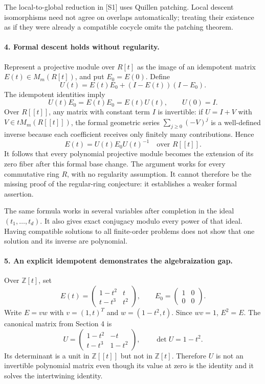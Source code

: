 \documentclass[11pt]{article}
\begin{document}
The local-to-global reduction in [S1] uses Quillen patching. Local descent isomorphisms need not agree on overlaps automatically; treating their existence as if they were already a compatible cocycle omits the patching theorem.

\paragraph{4. Formal descent holds without regularity.}
Represent a projective module over $R[t]$ as the image of an idempotent matrix $E(t)\in M_m(R[t])$, and put $E_0=E(0)$. Define
\[
 U(t)=E(t)E_0+(I-E(t))(I-E_0).
\]
The idempotent identities imply
\[
 U(t)E_0=E(t)E_0=E(t)U(t),\qquad U(0)=I.
\]
Over $R[[t]]$, any matrix with constant term $I$ is invertible: if $U=I+V$ with $V\in tM_m(R[[t]])$, the formal geometric series $\sum_{j\geq0}(-V)^j$ is a well-defined inverse because each coefficient receives only finitely many contributions. Hence
\[
 E(t)=U(t)E_0U(t)^{-1}\quad\text{over }R[[t]].
\]
It follows that every polynomial projective module becomes the extension of its zero fiber after this formal base change. The argument works for every commutative ring $R$, with no regularity assumption. It cannot therefore be the missing proof of the regular-ring conjecture: it establishes a weaker formal assertion.

The same formula works in several variables after completion in the ideal $(t_1,\ldots,t_d)$. It also gives exact conjugacy modulo every power of that ideal. Having compatible solutions to all finite-order problems does not show that one solution and its inverse are polynomial.

\paragraph{5. An explicit idempotent demonstrates the algebraization gap.}
Over $\mathbb Z[t]$, set
\[
 E(t)=\begin{pmatrix}1-t^2&t\\t-t^3&t^2\end{pmatrix},
 \qquad E_0=\begin{pmatrix}1&0\\0&0\end{pmatrix}.
\]
Write $E=vw$ with $v=(1,t)^T$ and $w=(1-t^2,t)$. Since $wv=1$, $E^2=E$. The canonical matrix from Section 4 is
\[
 U=\begin{pmatrix}1-t^2&-t\\t-t^3&1-t^2\end{pmatrix},
 \qquad\det U=1-t^2.
\]
Its determinant is a unit in $\mathbb Z[[t]]$ but not in $\mathbb Z[t]$. Therefore $U$ is not an invertible polynomial matrix even though its value at zero is the identity and it solves the intertwining identity.
\end{document}
